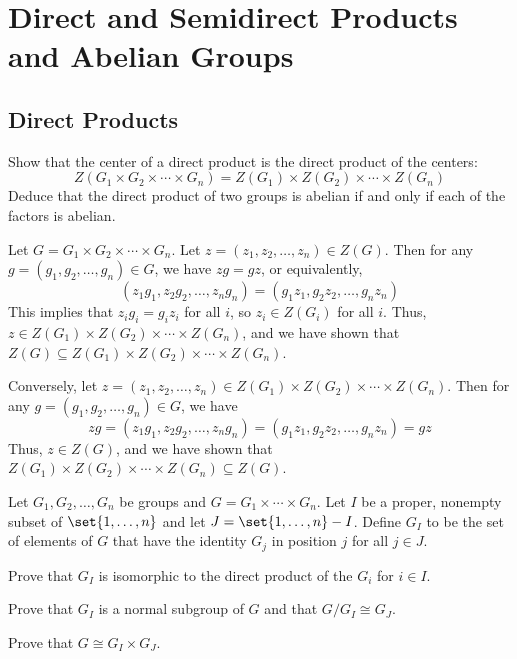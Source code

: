 \section{Direct and Semidirect Products and Abelian Groups}

\subsection{Direct Products}

\begin{exercise}\label{ex5.1.1}
    Show that the center of a direct product is the direct product of the centers:
    \[Z(G_1 \times G_2 \times \cdots \times G_n) = Z(G_1) \times Z(G_2) \times \cdots \times Z(G_n)\]
    Deduce that the direct product of two groups is abelian if and only if each of the factors is abelian.
\end{exercise}

\begin{sol}
    Let $G = G_1 \times G_2 \times \cdots \times G_n$. Let $z = (z_1, z_2, \ldots, z_n) \in Z(G)$. Then for any $g = (g_1, g_2, \ldots, g_n) \in G$, we have $zg = gz$, or equivalently,
    \[(z_1g_1, z_2g_2, \ldots, z_ng_n) = (g_1z_1, g_2z_2, \ldots, g_nz_n)\]
    This implies that $z_i g_i = g_i z_i$ for all $i$, so $z_i \in Z(G_i)$ for all $i$. Thus, $z \in Z(G_1) \times Z(G_2) \times \cdots \times Z(G_n)$, and we have shown that $Z(G) \subseteq Z(G_1) \times Z(G_2) \times \cdots \times Z(G_n)$.

    Conversely, let $z = (z_1, z_2, \ldots, z_n) \in Z(G_1) \times Z(G_2) \times \cdots \times Z(G_n)$. Then for any $g = (g_1, g_2, \ldots, g_n) \in G$, we have
    \[zg = (z_1g_1, z_2g_2, \ldots, z_ng_n) = (g_1z_1, g_2z_2, \ldots, g_nz_n) = gz\]
    Thus, $z \in Z(G)$, and we have shown that $Z(G_1) \times Z(G_2) \times \cdots \times Z(G_n) \subseteq Z(G)$.
\end{sol}

\begin{exercise}\label{ex5.1.2}
    Let $G_1, G_2, \ldots, G_n$ be groups and $G = G_1 \times \cdots \times G_n$. Let $I$ be a proper, nonempty subset of $\set{1, \ldots, n}$ and let $J = \set{1, \ldots, n} - I$. Define $G_I$ to be the set of elements of $G$ that have the identity $G_j$ in position $j$ for all $j \in J$.
    \begin{subproblems}
        \item Prove that $G_I$ is isomorphic to the direct product of the $G_i$ for $i \in I$.
        \item Prove that $G_I$ is a normal subgroup of $G$ and that $G/G_I \cong G_J$.
        \item Prove that $G \cong G_I \times G_J$.
    \end{subproblems}
\end{exercise}

